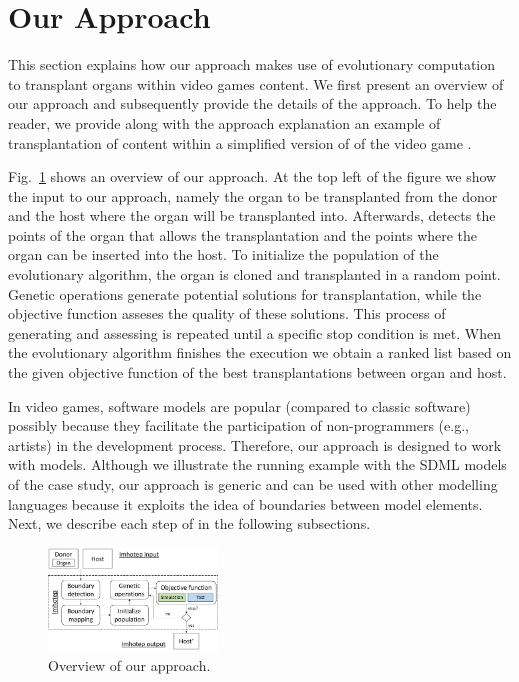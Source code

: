 \section{Our \ApproachName{} Approach} 
\label{sec:Approach}

This section explains how our \ApproachName{} approach makes use of evolutionary computation to transplant organs within video games content. We first present an overview of our approach and subsequently provide the details of the approach. To help the reader, we provide along with the approach explanation an example of transplantation of content within a simplified version of  of the video game \CaseStudy{}.

Fig.~\ref{fig:approach} shows an overview of our approach.
At the top left of the figure we show the input to our approach, namely the organ to be transplanted from the donor and the host where the organ will be transplanted into. Afterwards, \ApproachName{} detects the points of the organ that allows the transplantation and the points where the organ can be inserted into the host. To initialize the population of the evolutionary algorithm, the organ is cloned and transplanted in a random point. Genetic operations generate potential solutions for transplantation, while the objective function asseses the quality of these solutions. This process of generating and assessing is repeated until a specific stop condition is met. When the evolutionary algorithm finishes the execution we obtain a ranked list based on the given objective function of the best transplantations between organ and host.

In video games, software models are popular (compared to classic software) possibly because they facilitate the participation of non-programmers (e.g., artists) in the development process. Therefore, our \ApproachName{} approach is designed to work with models. Although we illustrate the running example with the SDML models of the case study, our approach is generic and can be used with other modelling languages because it exploits the idea of boundaries between model elements.
Next, we describe each step of \ApproachName{} in the following subsections.

\begin{figure}[h]
    \centering
    \includegraphics[width=0.4\textwidth]{Figures/overview.png}
    \caption{Overview of our \ApproachName{} approach.}
    \label{fig:approach}
\end{figure}


